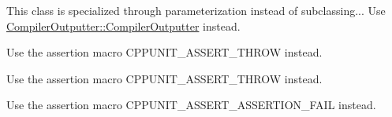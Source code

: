 \begin{DoxyRefList}
This class is specialized through parameterization instead of subclassing... Use \hyperlink{class_compiler_outputter_af2cc635d13fa2ecc5721713513769d91}{Compiler\+Outputter\+::\+Compiler\+Outputter} instead.  
\item[\label{deprecated__deprecated000004}%
\hypertarget{deprecated__deprecated000004}{}%
Member \hyperlink{group___writing_test_fixture_gaca8eeb6f60714baade6cbfd185868c40}{C\+P\+P\+U\+N\+I\+T\+\_\+\+T\+E\+S\+T\+\_\+\+E\+X\+C\+E\+P\+T\+I\+O\+N} (test\+Method, Exception\+Type)]Use the assertion macro C\+P\+P\+U\+N\+I\+T\+\_\+\+A\+S\+S\+E\+R\+T\+\_\+\+T\+H\+R\+O\+W instead. 

Use the assertion macro C\+P\+P\+U\+N\+I\+T\+\_\+\+A\+S\+S\+E\+R\+T\+\_\+\+T\+H\+R\+O\+W instead.  
\item[\label{deprecated__deprecated000005}%
\hypertarget{deprecated__deprecated000005}{}%
Member \hyperlink{group___writing_test_fixture_ga5bdaf0444216a8f93ead13d5ae964d7e}{C\+P\+P\+U\+N\+I\+T\+\_\+\+T\+E\+S\+T\+\_\+\+F\+A\+I\+L} (test\+Method)]Use the assertion macro C\+P\+P\+U\+N\+I\+T\+\_\+\+A\+S\+S\+E\+R\+T\+\_\+\+A\+S\+S\+E\+R\+T\+I\+O\+N\+\_\+\+F\+A\+I\+L instead. 


\end{DoxyRefList}

